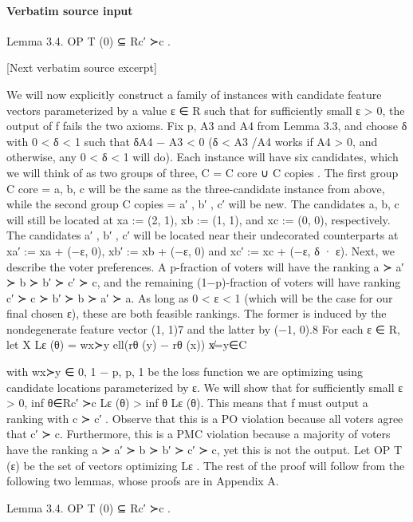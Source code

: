 \documentclass[10pt]{article}
\begin{document}
\paragraph{Verbatim source input}
\begin{ReviewVerbatim}
Lemma 3.4. OP T (0) ⊆ Rc′ ≻c .

[Next verbatim source excerpt]

We will now explicitly construct a family of instances with candidate feature vectors parameterized
by a value ε ∈ R such that for sufficiently small ε > 0, the output of f fails the two axioms. Fix
p, A3 and A4 from Lemma 3.3, and choose δ with 0 < δ < 1 such that δA4 − A3 < 0 (δ < A3 /A4
works if A4 > 0, and otherwise, any 0 < δ < 1 will do).
Each instance will have six candidates, which we will think of as two groups of three, C = C core ∪
C copies . The first group C core = {a, b, c} will be the same as the three-candidate instance from
above, while the second group C copies = {a′ , b′ , c′ } will be new. The candidates a, b, c will still be
located at xa := (2, 1), xb := (1, 1), and xc := (0, 0), respectively. The candidates a′ , b′ , c′ will
be located near their undecorated counterparts at xa′ := xa + (−ε, 0), xb′ := xb + (−ε, 0) and
xc′ := xc + (−ε, δ · ε).
Next, we describe the voter preferences. A p-fraction of voters will have the ranking a ≻ a′ ≻ b ≻
b′ ≻ c′ ≻ c, and the remaining (1−p)-fraction of voters will have ranking c′ ≻ c ≻ b′ ≻ b ≻ a′ ≻ a.
As long as 0 < ε < 1 (which will be the case for our final chosen ε), these are both feasible rankings.
The former is induced by the nondegenerate feature vector (1, 1)7 and the latter by (−1, 0).8
For each ε ∈ R, let                                 X
                                      Lε (θ) =             wx≻y ell(rθ (y) − rθ (x))
                                                  x̸=y∈C

with wx≻y ∈ {0, 1 − p, p, 1} be the loss function we are optimizing using candidate locations
parameterized by ε.
We will show that for sufficiently small ε > 0, inf θ∈Rc′ ≻c Lε (θ) > inf θ Lε (θ). This means that
f must output a ranking with c ≻ c′ . Observe that this is a PO violation because all voters agree
that c′ ≻ c. Furthermore, this is a PMC violation because a majority of voters have the ranking
a ≻ a′ ≻ b ≻ b′ ≻ c′ ≻ c, yet this is not the output.
Let OP T (ε) be the set of vectors optimizing Lε . The rest of the proof will follow from the following
two lemmas, whose proofs are in Appendix A.

Lemma 3.4. OP T (0) ⊆ Rc′ ≻c .


\end{ReviewVerbatim}
\end{document}
